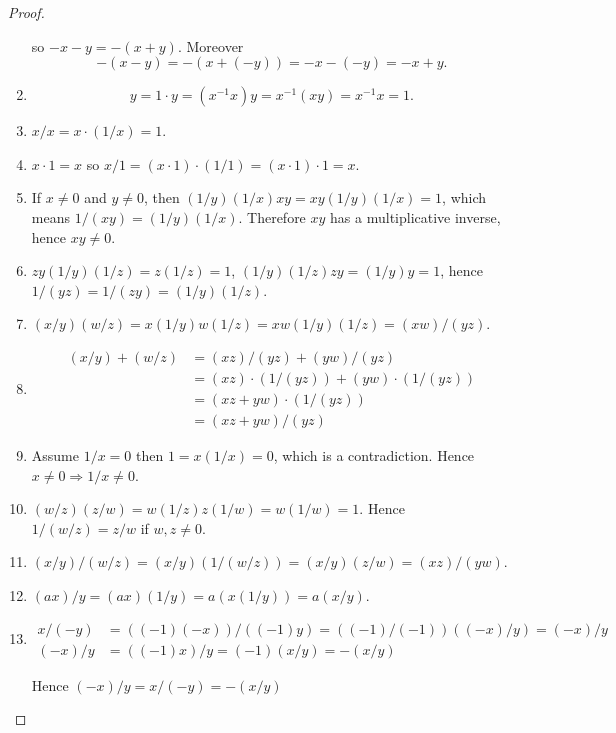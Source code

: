 \begin{proof}
\begin{enumerate}[label={(\alph*)}]
              so $-x - y = -(x + y)$. Moreover
              \[
                  -(x - y) = -(x + (-y)) = -x - (-y) = -x + y.
              \]
        \item \[
                  y = 1\cdot y = (x^{-1}x)y = x^{-1}(xy) = x^{-1}x = 1.
              \]
        \item $x/x = x\cdot (1/x) = 1$.
        \item $x\cdot 1 = x$ so $x/1 = (x\cdot 1)\cdot (1/1) = (x\cdot 1)\cdot 1 = x$.
        \item If $x\ne 0$ and $y\ne 0$, then $(1/y)(1/x)xy = xy(1/y)(1/x) = 1$, which means $1/(xy) = (1/y)(1/x)$. Therefore $xy$ has a multiplicative inverse, hence $xy\ne 0$.
        \item $zy(1/y)(1/z) = z(1/z) = 1$, $(1/y)(1/z)zy = (1/y)y = 1$, hence $1/(yz) = 1/(zy) = (1/y)(1/z)$.
        \item $(x/y)(w/z) = x(1/y)w(1/z) = xw(1/y)(1/z) = (xw)/(yz)$.
        \item \begin{align*}
                  (x/y) + (w/z) & = (xz)/(yz) + (yw)/(yz)                   \\
                                & = (xz)\cdot (1/(yz)) + (yw)\cdot (1/(yz)) \\
                                & = (xz + yw)\cdot (1/(yz))                 \\
                                & = (xz + yw)/(yz)
              \end{align*}
        \item Assume $1/x = 0$ then $1 = x(1/x) = 0$, which is a contradiction. Hence $x\ne 0\Rightarrow 1/x\ne 0$.
        \item $(w/z)(z/w) = w(1/z)z(1/w) = w(1/w) = 1$. Hence $1/(w/z) = z/w$ if $w, z\ne 0$.
        \item $(x/y)/(w/z) = (x/y)(1/(w/z)) = (x/y)(z/w) = (xz)/(yw)$.
        \item $(ax)/y = (ax)(1/y) = a(x(1/y)) = a(x/y)$.
        \item \begin{align*}
                  x/(-y) & = ((-1)(-x))/((-1)y) = ((-1)/(-1))((-x)/y) = (-x)/y \\
                  (-x)/y & = ((-1)x)/y = (-1)(x/y) = -(x/y)
              \end{align*}

              Hence $(-x)/y = x/(-y) = -(x/y)$
    \end{enumerate}
\end{proof}

